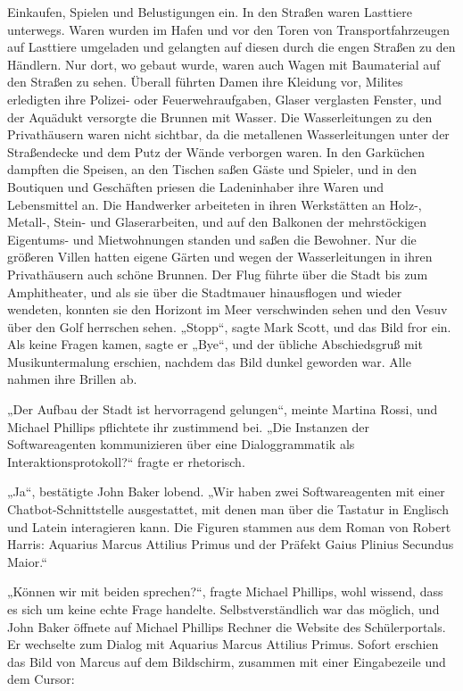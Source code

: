 \documentclass[
]{article}
\begin{document}
Einkaufen, Spielen und Belustigungen ein. In den Straßen waren Lasttiere
unterwegs. Waren wurden im Hafen und vor den Toren von
Transportfahrzeugen auf Lasttiere umgeladen und gelangten auf diesen
durch die engen Straßen zu den Händlern. Nur dort, wo gebaut wurde,
waren auch Wagen mit Baumaterial auf den Straßen zu sehen. Überall
führten Damen ihre Kleidung vor, Milites erledigten ihre Polizei- oder
Feuerwehraufgaben, Glaser verglasten Fenster, und der Aquädukt versorgte
die Brunnen mit Wasser. Die Wasserleitungen zu den Privathäusern waren
nicht sichtbar, da die metallenen Wasserleitungen unter der Straßendecke
und dem Putz der Wände verborgen waren. In den Garküchen dampften die
Speisen, an den Tischen saßen Gäste und Spieler, und in den Boutiquen
und Geschäften priesen die Ladeninhaber ihre Waren und Lebensmittel an.
Die Handwerker arbeiteten in ihren Werkstätten an Holz-, Metall-, Stein-
und Glaserarbeiten, und auf den Balkonen der mehrstöckigen Eigentums-
und Mietwohnungen standen und saßen die Bewohner. Nur die größeren
Villen hatten eigene Gärten und wegen der Wasserleitungen in ihren
Privathäusern auch schöne Brunnen. Der Flug führte über die Stadt bis
zum Amphitheater, und als sie über die Stadtmauer hinausflogen und
wieder wendeten, konnten sie den Horizont im Meer verschwinden sehen und
den Vesuv über den Golf herrschen sehen. „Stopp``, sagte Mark Scott, und
das Bild fror ein. Als keine Fragen kamen, sagte er „Bye``, und der
übliche Abschiedsgruß mit Musikuntermalung erschien, nachdem das Bild
dunkel geworden war. Alle nahmen ihre Brillen ab.

„Der Aufbau der Stadt ist hervorragend gelungen``, meinte Martina Rossi,
und Michael Phillips pflichtete ihr zustimmend bei. „Die Instanzen der
Softwareagenten kommunizieren über eine Dialoggrammatik als
Interaktionsprotokoll?{\kern0pt}`` fragte er rhetorisch.

„Ja``, bestätigte John Baker lobend. „Wir haben zwei Softwareagenten mit
einer Chatbot-Schnittstelle ausgestattet, mit denen man über die
Tastatur in Englisch und Latein interagieren kann. Die Figuren stammen
aus dem Roman von Robert Harris: Aquarius Marcus Attilius Primus und der
Präfekt Gaius Plinius Secundus Maior.``

„Können wir mit beiden sprechen?{\kern0pt}``, fragte Michael Phillips,
wohl wissend, dass es sich um keine echte Frage handelte.
Selbstverständlich war das möglich, und John Baker öffnete auf Michael
Phillips\textquotesingle{} Rechner die Website des Schülerportals. Er
wechselte zum Dialog mit Aquarius Marcus Attilius Primus. Sofort
erschien das Bild von Marcus auf dem Bildschirm, zusammen mit einer
Eingabezeile und dem Cursor:
\end{document}
